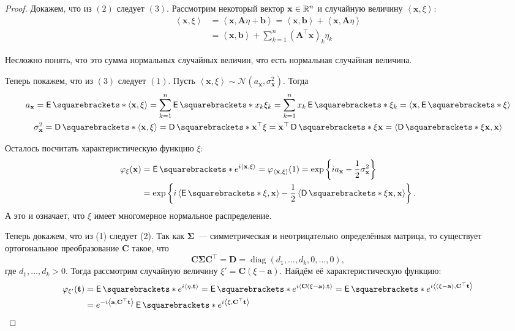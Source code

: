 \begin{proof}
	Докажем, что из \((2)\) следует \((3)\). Рассмотрим некоторый вектор 
	\(\mathbf{x} \in \mathbb{R}^n\) и случайную величину \(\left\langle\mathbf{x}, 
	\xi\right\rangle\):
	\begin{align*}
		\left\langle\mathbf{x}, \xi\right\rangle &= \left\langle\mathbf{x}, 
		\mathbf{A}\eta + \mathbf{b}\right\rangle = \left\langle\mathbf{x}, 
		\mathbf{b}\right\rangle + \left\langle\mathbf{x},  
		\mathbf{A}\eta\right\rangle \\
		&= \left\langle\mathbf{x}, \mathbf{b}\right\rangle + \sum_{k = 1}^{n} 
		\left(\mathbf{A^{\top} x}\right)_{k}\eta_{k}
	\end{align*}

	Несложно понять, что это сумма нормальных случайных величин, что есть 
	нормальная случайная величина.
	
	Теперь покажем, что из \((3)\) следует \((1)\). Пусть 
	\(\left\langle\mathbf{x}, \xi\right\rangle \sim \mathcal{N}(a_{\mathbf{x}}, 
	\sigma_{\mathbf{x}}^2)\). Тогда
	\begin{gather*}
		a_{\mathbf{x}} = \E{\left\langle\mathbf{x}, \xi\right\rangle} = \sum_{k 
		= 1}^{n} \E{x_{k}\xi_{k}} = \sum_{k = 1}^{n} x_{k}\E{\xi_{k}} = 
		\left\langle\mathbf{x}, \E{\xi}\right\rangle \\
		\sigma_{\mathbf{x}}^2 = \D{\left\langle\mathbf{x}, \xi\right\rangle} =  
		\D{\mathbf{x}^{\top}\xi} = \mathbf{x}^{\top}\D{\xi}\mathbf{x} = 
		\left\langle\D{\xi}\mathbf{x}, \mathbf{x}\right\rangle
	\end{gather*}

	Осталось посчитать характеристическую функцию \(\xi\):
	\begin{align}
		\phi_{\xi}(\mathbf{x}) &= \E{e^{i\left\langle\mathbf{x}, 
		\xi\right\rangle}} = \phi_{\left\langle\mathbf{x}, \xi\right\rangle}(1) 
		= \exp\left\{ia_{\mathbf{x}} - \frac{1}{2}\sigma_{\mathbf{x}}^2\right\} 
		\\
		&= \exp\left\{i\left\langle\E{\xi}, \mathbf{x}\right\rangle - 
		\frac{1}{2}\left\langle\D{\xi}\mathbf{x}, 
		\mathbf{x}\right\rangle\right\}.
	\end{align}
	А это и означает, что \(\xi\) имеет многомерное нормальное распределение.
	
	Теперь докажем, что из (1) следует (2). Так как \(\mathbf{\Sigma}\)~--- 
	симметрическая и неотрицательно определённая матрица, то существует 
	ортогональное преобразование \(\mathbf{C}\) такое, что
	\[
		\mathbf{C \Sigma C}^{\top} = \mathbf{D} = \operatorname{diag}(d_1, 
		\dots, d_k, 0, \dots, 0),
	\]
	где \(d_1, \dots, d_k > 0\). Тогда рассмотрим случайную величину \(\xi' = 
	\mathbf{C}(\xi - \mathbf{a})\). Найдём её характеристическую функцию:
	\begin{align*}
		\phi_{\xi'}(\mathbf{t}) &= \E{e^{i\left\langle \eta, 
		\mathbf{t}\right\rangle}} = \E{e^{i\left\langle \mathbf{C}(\xi - 
		\mathbf{a}), \mathbf{t}\right\rangle}} = \E{e^{i\left\langle (\xi - 
		\mathbf{a}), \mathbf{C}^{\top}\mathbf{t}\right\rangle}} \\
		&= e^{-i\left\langle \mathbf{a}, 
		\mathbf{C}^{\top}\mathbf{t}\right\rangle}\E{e^{i\left\langle \xi, 
		\mathbf{C}^{\top}\mathbf{t}\right\rangle}}
	\end{align*}
	

\end{proof}
